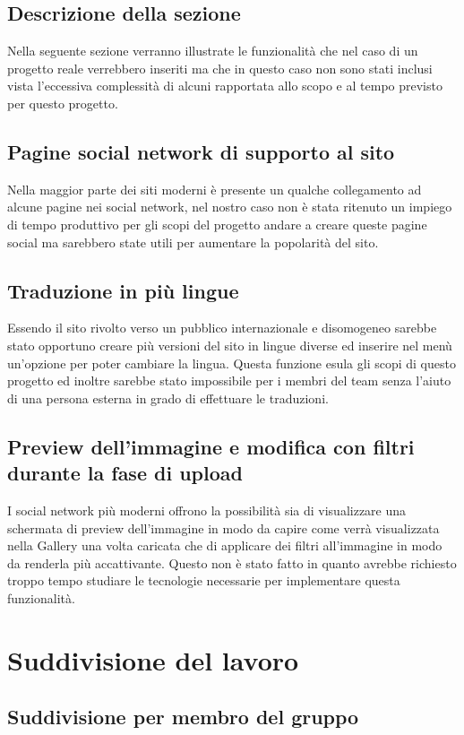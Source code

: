 \documentclass[openany, a4paper, 12pt]{report}
\begin{document}
		\section{Descrizione della sezione}
		Nella seguente sezione verranno illustrate le funzionalità che nel caso di un progetto reale verrebbero inseriti ma che in questo caso non sono stati inclusi vista l'eccessiva complessità di alcuni rapportata allo scopo e al tempo previsto per questo progetto.

		\section{Pagine social network di supporto al sito}
		Nella maggior parte dei siti moderni è presente un qualche collegamento ad alcune pagine nei social network, nel nostro caso non è stata ritenuto un impiego di tempo produttivo per gli scopi del progetto andare a creare queste pagine social ma sarebbero state utili per aumentare la popolarità del sito.

		\section{Traduzione in più lingue}
		Essendo il sito rivolto verso un pubblico internazionale e disomogeneo sarebbe stato opportuno creare più versioni del sito in lingue diverse ed inserire nel menù un'opzione per poter cambiare la lingua. Questa funzione esula gli scopi di questo progetto ed inoltre sarebbe stato impossibile per i membri del team senza l'aiuto di una persona esterna in grado di effettuare le traduzioni.
		
		\section{Preview dell'immagine e modifica con filtri durante la fase di upload}
		I social network più moderni offrono la possibilità sia di visualizzare una schermata di preview dell'immagine in modo da capire come verrà visualizzata nella Gallery una volta caricata che di applicare dei filtri all'immagine in modo da renderla più accattivante. Questo non è stato fatto in quanto avrebbe richiesto troppo tempo studiare le tecnologie necessarie per implementare questa funzionalità.


	\chapter{Suddivisione del lavoro}
	\section{Suddivisione per membro del gruppo}
\end{document}
